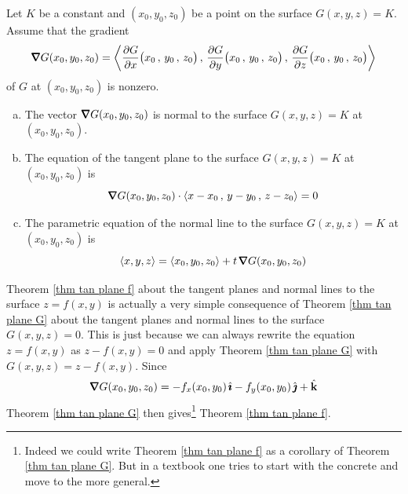 \begin{theorem}\label{thm tan plane G}
Let $K$ be a constant and $(x_0,y_0,z_0)$ be a point on the surface 
$G(x,y,z)=K$. Assume that the gradient 
\begin{equation*}
\vnabla G(x_0,y_0,z_0)
 = \llt \pdiff{G}{x}\big( x_0\,,\,y_0\,,\,z_0\big)\,,\,
     \pdiff{G}{y}\big( x_0\,,\,y_0\,,\,z_0\big)\,,\,
     \pdiff{G}{z}\big( x_0\,,\,y_0\,,\,z_0\big)\rgt
\end{equation*}
of $G$ at $(x_0,y_0,z_0)$ is nonzero.
\begin{enumerate}[(a)]
\item 
The vector $\vnabla G(x_0,y_0,z_0)$
is normal to the surface $G(x,y,z)=K$ at $(x_0,y_0,z_0)$.

\item
The equation of the tangent plane to the surface $G(x,y,z)=K$ 
at $(x_0,y_0,z_0)$ is
\begin{equation*}
\vnabla G(x_0,y_0,z_0)\cdot\llt x-x_0\,,\,y-y_0\,,\,z-z_0\rgt =0
\end{equation*}

\item
The parametric equation of the normal line to the surface $G(x,y,z)=K$ 
at $(x_0,y_0,z_0)$ is
\begin{equation*}
\llt x,y,z \rgt =  \llt x_0,y_0,z_0 \rgt
                 +t\,\vnabla G(x_0,y_0,z_0)
\end{equation*}
\end{enumerate}
\end{theorem}


\begin{remark}\label{rem tan plane}
Theorem \ref{thm tan plane f} about the tangent planes and normal lines
to the surface $z=f(x,y)$ is actually a very simple consequence of
Theorem \ref{thm tan plane G} about the tangent planes and normal lines
to the surface $G(x,y,z)=0$. This is just because we can always 
rewrite the equation $z=f(x,y)$ as $z-f(x,y)=0$ and apply
Theorem \ref{thm tan plane G} with $G(x,y,z)=z-f(x,y)$. Since
\begin{equation*}
\vnabla G(x_0,y_0,z_0) = -f_x(x_0,y_0)\,\hi -f_y(x_0,y_0)\,\hj +\hk
\end{equation*}
Theorem \ref{thm tan plane G} then gives\footnote{Indeed we could write 
Theorem \ref{thm tan plane f} as a corollary of Theorem \ref{thm tan plane G}.
But in a textbook one tries to start with the concrete and move to the more
general.} 
Theorem \ref{thm tan plane f}.
\end{remark}

